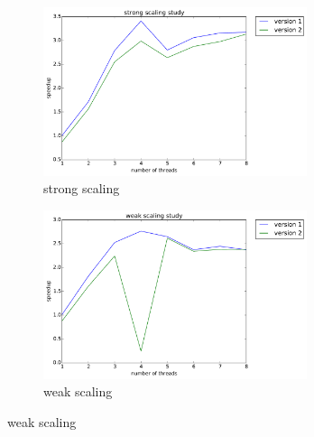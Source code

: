 \documentclass[12pt]{article}
\numberwithin{equation}{section}
\begin{document}
\begin{figure}[!ht]
   \begin{subfigure}
      \centering
        \begin{center}
      \includegraphics[width=0.85\textwidth] {plots/1_for_strong}
        \end{center}
      \label{aload0}
      \caption{strong scaling}
  \end{subfigure}
  \begin{subfigure}
      \centering
        \begin{center}
      \includegraphics[width=0.85\textwidth] {plots/1_for_weak}
        \end{center}
      \label{aload1}
      \caption{weak scaling}
  \end{subfigure}

\end{figure}
\end{document}
